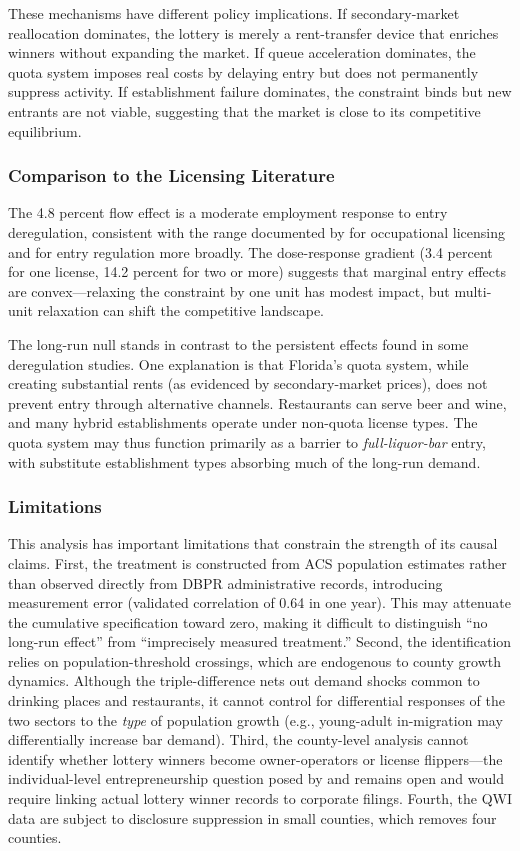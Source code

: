 \documentclass[12pt]{article}
\begin{document}
These mechanisms have different policy implications. If secondary-market reallocation dominates, the lottery is merely a rent-transfer device that enriches winners without expanding the market. If queue acceleration dominates, the quota system imposes real costs by delaying entry but does not permanently suppress activity. If establishment failure dominates, the constraint binds but new entrants are not viable, suggesting that the market is close to its competitive equilibrium.

\subsubsection*{Comparison to the Licensing Literature} The 4.8 percent flow effect is a moderate employment response to entry deregulation, consistent with the range documented by \citet{kleiner2006} for occupational licensing and \citet{djankov2002} for entry regulation more broadly. The dose-response gradient (3.4 percent for one license, 14.2 percent for two or more) suggests that marginal entry effects are convex---relaxing the constraint by one unit has modest impact, but multi-unit relaxation can shift the competitive landscape.

The long-run null stands in contrast to the persistent effects found in some deregulation studies. One explanation is that Florida's quota system, while creating substantial rents (as evidenced by secondary-market prices), does not prevent entry through alternative channels. Restaurants can serve beer and wine, and many hybrid establishments operate under non-quota license types. The quota system may thus function primarily as a barrier to \textit{full-liquor-bar} entry, with substitute establishment types absorbing much of the long-run demand.

\subsubsection*{Limitations} This analysis has important limitations that constrain the strength of its causal claims. First, the treatment is constructed from ACS population estimates rather than observed directly from DBPR administrative records, introducing measurement error (validated correlation of 0.64 in one year). This may attenuate the cumulative specification toward zero, making it difficult to distinguish ``no long-run effect'' from ``imprecisely measured treatment.'' Second, the identification relies on population-threshold crossings, which are endogenous to county growth dynamics. Although the triple-difference nets out demand shocks common to drinking places and restaurants, it cannot control for differential responses of the two sectors to the \textit{type} of population growth (e.g., young-adult in-migration may differentially increase bar demand). Third, the county-level analysis cannot identify whether lottery winners become owner-operators or license flippers---the individual-level entrepreneurship question posed by \citet{evans1989} and \citet{hurst2004} remains open and would require linking actual lottery winner records to corporate filings. Fourth, the QWI data are subject to disclosure suppression in small counties, which removes four counties.
\end{document}
